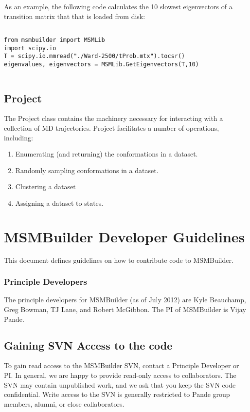 \documentclass[12pt]{article}
\begin{document}
As an example, the following code calculates the 10 slowest eigenvectors of a transition matrix that that is loaded from disk:

\begin{verbatim}
 
from msmbuilder import MSMLib
import scipy.io
T = scipy.io.mmread("./Ward-2500/tProb.mtx").tocsr()
eigenvalues, eigenvectors = MSMLib.GetEigenvectors(T,10)
 
\end{verbatim}


\subsection{Project}

The Project class contains the machinery necessary for interacting with a collection of MD trajectories.  Project facilitates a number of operations, including:

\begin{enumerate}
\item Enumerating (and returning) the conformations in a dataset.
\item Randomly sampling conformations in a dataset.
\item Clustering a dataset
\item Assigning a dataset to states.

\end{enumerate}




\section{MSMBuilder Developer Guidelines}



This document defines guidelines on how to contribute code to MSMBuilder.  

\subsubsection{Principle Developers}

The principle developers for MSMBuilder (as of July 2012) are Kyle Beauchamp, Greg Bowman, TJ Lane, and Robert McGibbon.  The PI of MSMBuilder is Vijay Pande.


\subsection{Gaining SVN Access to the code}
To gain read access to the MSMBuilder SVN, contact a Principle Developer or PI.  In general, we are happy to provide read-only access to collaborators.  The SVN may contain unpublished work, and we ask that you keep the SVN code confidential.  Write access to the SVN is generally restricted to Pande group members, alumni, or close collaborators.  
\end{document}
